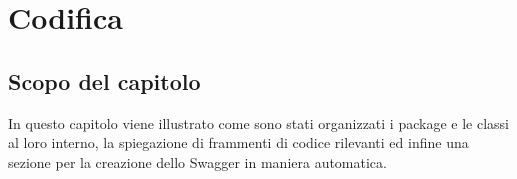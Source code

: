 \chapter{Codifica}
\label{cap:codifica}

\section{Scopo del capitolo}
In questo capitolo viene illustrato come sono stati organizzati i package e le classi al loro interno, la spiegazione di frammenti di codice rilevanti ed infine una sezione per la creazione dello Swagger in maniera automatica. \\









